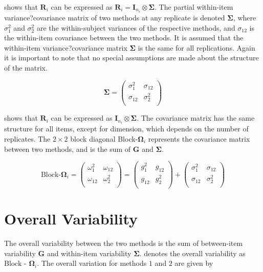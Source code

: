 \documentclass[12pt, a4paper]{report}
\theoremstyle{plain}
\theoremstyle{definition}
\theoremstyle{remark}
\begin{document}
\citet{hamlett} shows that $\boldsymbol{R}_{i}$  can be expressed as $\boldsymbol{R}_{i} = \boldsymbol{I}_{n_{i}} \otimes \boldsymbol{\Sigma}$. The partial within-item variance?covariance matrix of two methods at any replicate is denoted $\boldsymbol{\Sigma}$, where $\sigma^2_{1}$ and $\sigma^2_{2}$ are the within-subject variances of the respective methods, and $\sigma_{12}$ is the within-item covariance between the two methods. It is assumed that the within-item variance?covariance matrix $\boldsymbol{\Sigma}$ is the same for all replications. Again it is important to note that no special assumptions are made about the structure of the matrix.

\begin{equation}
\boldsymbol{\Sigma} = \left( \begin{array}{cc}
\sigma^2_{1} & \sigma_{12} \\
\sigma_{12} & \sigma^2_{2} \\
\end{array}\right)
\end{equation}

\citet{hamlett} shows that $\boldsymbol{R}_{i}$  can be expressed as $\boldsymbol{I}_{n_{i}} \otimes \boldsymbol{\Sigma}$. The covariance matrix has the same structure for all items, except for dimension, which depends on the number of replicates. The $2 \times 2$ block diagonal Block-$\boldsymbol{\Omega}_{i}$ represents the covariance matrix between two methods, and is the sum of $\boldsymbol{G}$ and $\boldsymbol{\Sigma}$.

\[ \textrm{Block-}\boldsymbol{\Omega}_{i}  = \left(\begin{array}{cc}
\omega^2_1  & \omega_{12} \\
\omega_{12} & \omega^2_2 \\
\end{array}  \right)
=  \left(
\begin{array}{cc}
g^2_1  & g_{12} \\
g_{12} & g^2_2 \\
\end{array} \right)+
\left(
\begin{array}{cc}
\sigma^2_1  & \sigma_{12} \\
\sigma_{12} & \sigma^2_2 \\
\end{array}\right)
\]

\section{Overall Variability}
The overall variability between the two methods is the sum of between-item variability
$\boldsymbol{G}$ and within-item variability $\boldsymbol{\Sigma}$. \citet{ARoy2009} denotes the overall variability	as ${\mbox{Block - }\boldsymbol \Omega_{i}}$. The overall variation for methods $1$ and $2$ are given by
\end{document}
